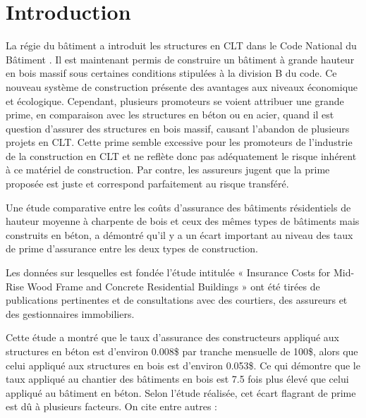 \documentclass[11pt]{article}
\begin{document}
\newpage
{}

\section{Introduction}

La régie du bâtiment a introduit les structures en CLT dans le Code National du Bâtiment \cite{CNB}. Il est maintenant permis de construire un bâtiment à grande hauteur en bois massif sous certaines conditions stipulées à la division B du code. Ce nouveau système de construction présente des avantages aux niveaux économique et écologique.
Cependant, plusieurs promoteurs se voient attribuer une grande prime, en comparaison avec les structures en béton ou en acier, quand il est question d'assurer des structures en bois massif, causant l'abandon de plusieurs projets en CLT. Cette prime semble excessive pour les promoteurs de l'industrie de la construction en CLT et ne reflète donc pas adéquatement le risque inhérent à ce matériel de construction. Par contre, les assureurs jugent que la prime proposée est juste et correspond parfaitement au risque transféré.

Une étude comparative \cite{GLOBEADVISORS1} entre les coûts d'assurance des bâtiments résidentiels de hauteur moyenne à charpente de bois et ceux des mêmes types de bâtiments mais construits en béton, a démontré qu'il y a un écart important au niveau des taux de prime d'assurance entre les deux types de construction.

Les données sur lesquelles est fondée l'étude intitulée « Insurance Costs for Mid-Rise Wood Frame and Concrete Residential Buildings » ont été tirées de publications pertinentes et de consultations avec des courtiers, des assureurs et des gestionnaires immobiliers. 

Cette étude a montré que le taux d'assurance des constructeurs appliqué aux structures en béton est d'environ 0.008\$ par tranche mensuelle de 100\$, alors que celui appliqué aux structures en bois est d'environ 0.053\$. Ce qui démontre que le taux appliqué au chantier des bâtiments en bois est 7.5 fois plus élevé que celui appliqué au bâtiment en béton. Selon l'étude réalisée, cet écart flagrant de prime est dû à plusieurs facteurs. On cite entre autres :
\end{document}
